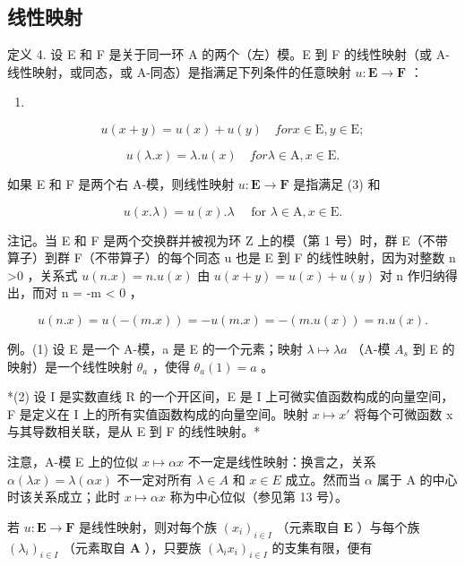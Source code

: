 \subsection{线性映射}

定义 4. 设 E 和 F 是关于同一环 A 的两个（左）模。E 到 F 的线性映射（或 A-线性映射，或同态，或 A-同态）是指满足下列条件的任意映射 \(u: \mathbf{E} \to \mathbf{F}\) ：

\begin{enumerate}
\def\labelenumi{(\arabic{enumi})}
\setcounter{enumi}{2}
\tightlist
\item
\end{enumerate}

\[
u (x + y) = u (x) + u (y) \quad for x \in \mathrm{E}, y \in \mathrm{E};\tag{4G}
\]

\[
u (\lambda . x) = \lambda . u (x) \quad for \lambda \in \mathrm{A}, x \in \mathrm{E}.
\]

如果 E 和 F 是两个右 A-模，则线性映射 \(u: \mathbf{E} \to \mathbf{F}\) 是指满足 (3) 和

\[
u (x . \lambda) = u (x). \lambda \quad \text { for } \lambda \in \mathrm{A}, x \in \mathrm{E}.\tag{4D}
\]

注记。当 E 和 F 是两个交换群并被视为环 Z 上的模（第 1 号）时，群 E（不带算子）到群 F（不带算子）的每个同态 u 也是 E 到 F 的线性映射，因为对整数 n \textgreater0 ，关系式 \(u(n.x) = n.u(x)\) 由 \(u(x + y) = u(x) + u(y)\) 对 n 作归纳得出，而对 n = -m \textless{} 0 ，

\[
u (n. x) = u (- (m. x)) = - u (m. x) = - (m. u (x)) = n. u (x).
\]

例。(1) 设 E 是一个 A-模，a 是 E 的一个元素；映射 \(\lambda\mapsto\lambda a\) （A-模 \(A_{s}\) 到 E 的映射）是一个线性映射 \(\theta_{a}\) ，使得 \(\theta_{a}(1)=a\) 。

*(2) 设 I 是实数直线 R 的一个开区间，E 是 I 上可微实值函数构成的向量空间，F 是定义在 I 上的所有实值函数构成的向量空间。映射 \(x \mapsto x'\) 将每个可微函数 x 与其导数相关联，是从 E 到 F 的线性映射。*

注意，A-模 E 上的位似 \(x \mapsto \alpha x\) 不一定是线性映射：换言之，关系 \(\alpha(\lambda x) = \lambda(\alpha x)\) 不一定对所有 \(\lambda \in A\) 和 \(x \in E\) 成立。然而当 \(\alpha\) 属于 A 的中心时该关系成立；此时 \(x \mapsto \alpha x\) 称为中心位似（参见第 13 号）。

若 \(u: \mathbf{E} \to \mathbf{F}\) 是线性映射，则对每个族 \((x_{i})_{i \in I}\) （元素取自 \(\mathbf{E}\) ）与每个族 \((\lambda_{i})_{i \in I}\) （元素取自 \(\mathbf{A}\) ），只要族 \((\lambda_{i}x_{i})_{i \in I}\) 的支集有限，便有

